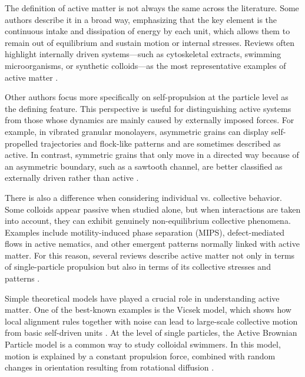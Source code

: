 
The definition of active matter is not always the same across the literature. Some authors describe it in a broad way, emphasizing that the key element is the continuous intake and dissipation of energy by each unit, which allows them to remain out of equilibrium and sustain motion or internal stresses. Reviews often highlight internally driven systems—such as cytoskeletal extracts, swimming microorganisms, or synthetic colloids—as the most representative examples of active matter \cite{ramaswamy2010mechanics, marchetti2013hydrodynamics, bechinger2016active}.

Other authors focus more specifically on self-propulsion at the particle level as the defining feature. This perspective is useful for distinguishing active systems from those whose dynamics are mainly caused by externally imposed forces. For example, in vibrated granular monolayers, asymmetric grains can display self-propelled trajectories and flock-like patterns and are sometimes described as active. In contrast, symmetric grains that only move in a directed way because of an asymmetric boundary, such as a sawtooth channel, are better classified as externally driven rather than active \cite{deseigne2010collective, mobarakabadi2013granular, fernandez2022active}.

There is also a difference when considering individual vs. collective behavior. Some colloids appear passive when studied alone, but when interactions are taken into account, they can exhibit genuinely non-equilibrium collective phenomena. Examples include motility-induced phase separation (MIPS), defect-mediated flows in active nematics, and other emergent patterns normally linked with active matter. For this reason, several reviews describe active matter not only in terms of single-particle propulsion but also in terms of its collective stresses and patterns \cite{cates2015motility, doostmohammadi2018active}.

Simple theoretical models have played a crucial role in understanding active matter. One of the best-known examples is the Vicsek model, which shows how local alignment rules together with noise can lead to large-scale collective motion from basic self-driven units \cite{vicsek1995novel, chate2008collective}. At the level of single particles, the Active Brownian Particle model is a common way to study colloidal swimmers. In this model, motion is explained by a constant propulsion force, combined with random changes in orientation resulting from rotational diffusion \cite{romanczuk2012active, elgeti2015physics}.


